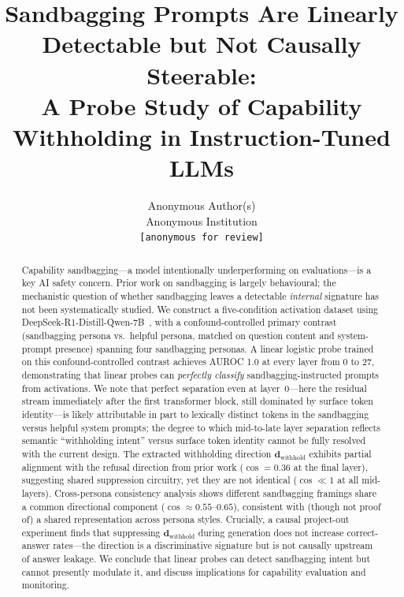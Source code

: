 \documentclass{article}
\title{Sandbagging Prompts Are Linearly Detectable but Not Causally Steerable:\\
A Probe Study of Capability Withholding in Instruction-Tuned LLMs}
\author{Anonymous Author(s) \\ Anonymous Institution \\ \texttt{[anonymous for review]}}
\begin{document}
\maketitle

\begin{abstract}
Capability sandbagging---a model intentionally underperforming on evaluations---is a key AI safety concern.
Prior work on sandbagging is largely behavioural; the mechanistic question of whether sandbagging leaves a detectable \emph{internal} signature has not been systematically studied.
We construct a five-condition activation dataset using DeepSeek-R1-Distill-Qwen-7B~\citep{deepseek2025r1}, with a confound-controlled primary contrast (sandbagging persona vs.\ helpful persona, matched on question content and system-prompt presence) spanning four sandbagging personas.
A linear logistic probe trained on this confound-controlled contrast achieves AUROC 1.0 at every layer from 0 to 27, demonstrating that linear probes can \emph{perfectly classify} sandbagging-instructed prompts from activations.
We note that perfect separation even at layer~0---here the residual stream immediately after the first transformer block, still dominated by surface token identity---is likely attributable in part to lexically distinct tokens in the sandbagging versus helpful system prompts; the degree to which mid-to-late layer separation reflects semantic ``withholding intent'' versus surface token identity cannot be fully resolved with the current design.
The extracted withholding direction $\mathbf{d}_{\text{withhold}}$ exhibits partial alignment with the refusal direction from prior work ($\cos = 0.36$ at the final layer), suggesting shared suppression circuitry, yet they are not identical ($\cos \ll 1$ at all mid-layers).
Cross-persona consistency analysis shows different sandbagging framings share a common directional component ($\cos \approx 0.55$--$0.65$), consistent with (though not proof of) a shared representation across persona styles.
Crucially, a causal project-out experiment finds that suppressing $\mathbf{d}_{\text{withhold}}$ during generation does not increase correct-answer rates---the direction is a discriminative signature but is not causally upstream of answer leakage.
We conclude that linear probes can detect sandbagging intent but cannot presently modulate it, and discuss implications for capability evaluation and monitoring.
\end{abstract}

\end{document}

